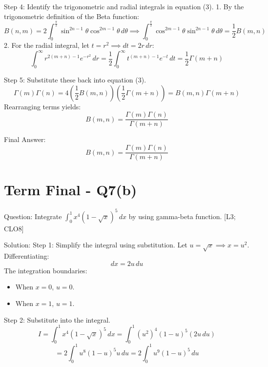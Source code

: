 \documentclass[11pt, a4paper]{article}
\begin{document}
Step 4: Identify the trigonometric and radial integrals in equation (3).
1. By the trigonometric definition of the Beta function:
\[
B(n, m) = 2 \int_{0}^{\frac{\pi}{2}} \sin^{2n-1}\theta \cos^{2m-1}\theta \, d\theta \implies \int_{0}^{\frac{\pi}{2}} \cos^{2m-1}\theta \sin^{2n-1}\theta \, d\theta = \frac{1}{2} B(m, n)
\]
2. For the radial integral, let $t = r^2 \implies dt = 2r \, dr$:
\[
\int_{0}^{\infty} r^{2(m+n)-1} e^{-r^2} \, dr = \frac{1}{2} \int_{0}^{\infty} t^{(m+n)-1} e^{-t} \, dt = \frac{1}{2} \Gamma(m+n)
\]

Step 5: Substitute these back into equation (3).
\[
\Gamma(m)\Gamma(n) = 4 \left( \frac{1}{2} B(m, n) \right) \left( \frac{1}{2} \Gamma(m+n) \right) = B(m, n) \Gamma(m+n)
\]
Rearranging terms yields:
\[
B(m, n) = \frac{\Gamma(m)\Gamma(n)}{\Gamma(m+n)}
\]

Final Answer:
\[
\boxed{B(m, n) = \frac{\Gamma(m)\Gamma(n)}{\Gamma(m+n)}}
\]





\section*{Term Final - Q7(b)}

Question:
Integrate $\int_{0}^{1} x^4 (1 - \sqrt{x})^5 \, dx$ by using gamma-beta function. [L3; CLO8]

Solution:
Step 1: Simplify the integral using substitution.
Let $u = \sqrt{x} \implies x = u^2$.
Differentiating:
\[
dx = 2u \, du
\]
The integration boundaries:
\begin{itemize}
    \item When $x = 0$, $u = 0$.
    \item When $x = 1$, $u = 1$.
\end{itemize}

Step 2: Substitute into the integral.
\[
I = \int_{0}^{1} x^4 (1 - \sqrt{x})^5 \, dx = \int_{0}^{1} (u^2)^4 (1 - u)^5 (2u \, du)
\]
\[
= 2 \int_{0}^{1} u^8 (1 - u)^5 u \, du = 2 \int_{0}^{1} u^9 (1 - u)^5 \, du
\]
\end{document}

